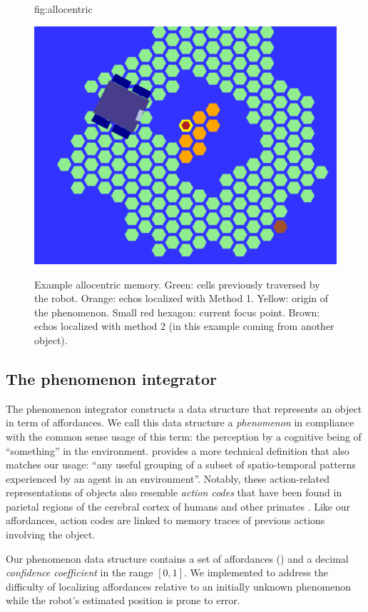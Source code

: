 \documentclass[pmlr]{jmlr}%
\begin{document}
\begin{figure}[htbp]
	\floatconts
	{fig:allocentric}
	{\caption{Example allocentric memory. 
	Green: cells previously traversed by the robot. 
	Orange: echos localized with Method 1.
	Yellow: origin of the phenomenon. 
	Small red hexagon: current focus point.
	Brown: echos localized with method 2 (in this example coming from another object).}}
	{\includegraphics[width=0.4\linewidth]{images/Figure_4_allocentric_memory}}
\end{figure}


\subsection{The phenomenon integrator}

The phenomenon integrator constructs a data structure that represents an object in term of affordances. 
We call this data structure a \textit{phenomenon} in compliance with the common sense usage of this term: the perception by a cognitive being of ``something'' in the environment.
\cite[][p. 8]{thorisson_explanation_2021} provides a more technical definition that also matches our usage: ``any useful grouping of a subset of spatio-temporal patterns experienced by an agent in an environment''.
Notably, these action-related representations of objects also resemble \textit{action codes} that have been found in parietal regions of the cerebral cortex of humans and other primates \citep{chao_representation_2000,colby_space_1999, schubotz_objects_2014}. 
Like our affordances, action codes are linked to memory traces of previous actions involving the object.

Our phenomenon data structure contains a set of affordances () and a decimal \textit{confidence coefficient} in the range $[0, 1]$. 
We implemented  to address the difficulty of localizing affordances relative to an initially unknown phenomenon while the robot's estimated position is prone to error. 
\end{document}
